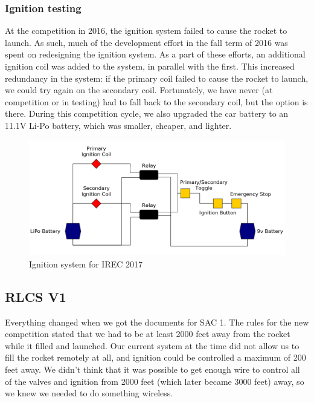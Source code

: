 \documentclass[11pt]{article}
\begin{document}
\subsubsection{Ignition testing}
\label{sec:orgfbd1ad2}

At the competition in 2016, the ignition system failed to cause the rocket to
launch. As such, much of the development effort in the fall term of 2016 was
spent on redesigning the ignition system. As a part of these efforts, an
additional ignition coil was added to the system, in parallel with the
first. This increased redundancy in the system: if the primary coil failed to
cause the rocket to launch, we could try again on the secondary
coil. Fortunately, we have never (at competition or in testing) had to fall back
to the secondary coil, but the option is there. During this competition cycle,
we also upgraded the car battery to an 11.1V Li-Po battery, which was smaller,
cheaper, and lighter.

\begin{figure}[htbp]
\centering
\includegraphics[width=.9\linewidth]{./images/tsig.png}
\caption{\label{fig:org7531236}
Ignition system for IREC 2017}
\end{figure}

\subsection{RLCS V1}
\label{sec:org468ac68}

Everything changed when we got the documents for SAC 1. The rules for the new
competition stated that we had to be at least 2000 feet away from the rocket
while it filled and launched. Our current system at the time did not allow us to
fill the rocket remotely at all, and ignition could be controlled a maximum of
200 feet away. We didn't think that it was possible to get enough wire to
control all of the valves and ignition from 2000 feet (which later became 3000
feet) away, so we knew we needed to do something wireless.
\end{document}
